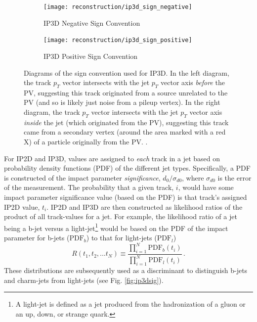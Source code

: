             \begin{figure}
                \begin{subfigure}{0.48\textwidth}
                    \texttt{[image: reconstruction/ip3d\_sign\_negative]}
                    \captionsetup{justification=centering} \caption{IP3D Negative Sign Convention}
                \end{subfigure}
                \begin{subfigure}{0.48\textwidth}
                    \texttt{[image: reconstruction/ip3d\_sign\_positive]}
                    \captionsetup{justification=centering} \caption{IP3D Positive Sign Convention}
                \end{subfigure}
                \caption{
                    Diagrams of the sign convention used for IP3D.
                    In the left diagram, the track $p_T$ vector intersects with the jet $p_T$ vector axis
                        \textit{before} the PV, suggesting this track originated from a source unrelated to the PV
                        (and so is likely just noise from a pileup vertex).
                    In the right diagram, the track $p_T$ vector intersects with the jet $p_T$ vector axis
                        \textit{inside} the jet (which originated from the PV),
                        suggesting this track came from a secondary vertex
                        (around the area marked with a red X)
                        of a particle originally from the PV.
                    \cite{thesis_giacinto}.
                }
                \label{fig:ip3d_sign}
            \end{figure}

            For IP2D and IP3D, values are assigned to \textit{each} track in a jet based on
                probability density functions (PDF) of the different jet types.
            Specifically, a PDF is constructed of the impact parameter \textit{significance}, $d_0/\sigma_{d0}$,
                where $\sigma_{d0}$ is the error of the measurement.
            The probability that a given track, $i$, would have some impact parameter significance value (based on the PDF)
                is that track's assigned IP2D value, $t_i$.
            IP2D and IP3D are then constructed as likelihood ratios of the product of all track-values for a jet.
            For example, the likelihood ratio of a jet being a b-jet versus a light-jet\footnote{
                    A light-jet is defined as a jet produced from the hadronization of a gluon or
                        an up, down, or strange quark.
                } would be based on the PDF of the impact parameter for
                b-jets ($\textrm{PDF}_b$) to that for light-jets ($\textrm{PDF}_l$)
            \begin{equation}
                R(t_1, t_2, ... t_N) \equiv \frac{\prod_{i=1}^N \textrm{PDF}_b(t_i)}{\prod_{i=1}^N \textrm{PDF}_l(t_i)}
                \,.
            \end{equation}
            These distributions are subsequently used as a discriminant to distinguish b-jets and charm-jets from light-jets
                (see Fig. \ref{fig:ip3dsig})\cite{thesis_giacinto}.

